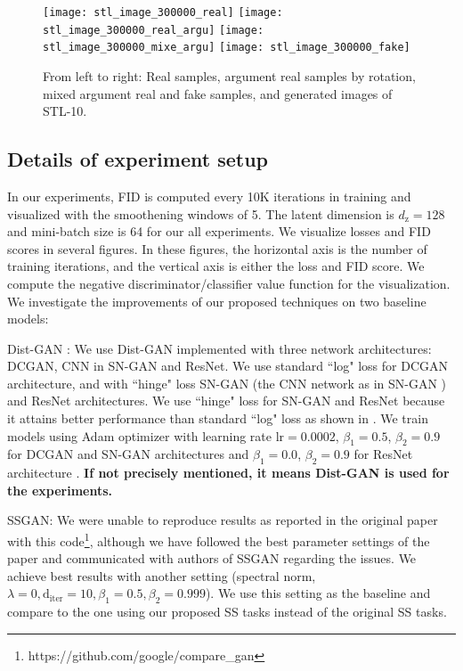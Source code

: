 \documentclass{article}
\begin{document}
\begin{figure}
  \centering
\texttt{[image: stl\_image\_300000\_real]}
  \texttt{[image: stl\_image\_300000\_real\_argu]}
  \texttt{[image: stl\_image\_300000\_mixe\_argu]}
  \texttt{[image: stl\_image\_300000\_fake]}
  \caption{From left to right: Real samples, argument real samples by rotation, mixed argument real and fake samples, and generated images of STL-10.}
  \label{stl_resnet_samples}
\end{figure}

\subsection{Details of experiment setup}
\label{ablation_study_ld}

In our experiments, FID is computed every 10K iterations in training and visualized with the smoothening windows of 5. The latent dimension is $d_\mathrm{z} = 128$ and mini-batch size is 64 for our all experiments. We visualize losses and FID scores in several figures. In these figures, the horizontal axis is the number of training iterations, and the vertical axis is either the loss and FID score. We compute the negative  discriminator/classifier value function for the visualization. We investigate the improvements of our proposed techniques on two baseline models:

Dist-GAN \cite{tran-eccv-2018}: We use Dist-GAN implemented with three network architectures: DCGAN, CNN in SN-GAN and ResNet.
We use standard ``log" loss for DCGAN architecture, and  with ``hinge" loss SN-GAN (the CNN network as in SN-GAN \cite{miyato-iclr-2018}) and ResNet architectures. We use ``hinge" loss for SN-GAN  and ResNet because it attains better performance than standard ``log" loss as shown in \cite{miyato-iclr-2018}. 
We train models using Adam optimizer with learning rate $\mathrm{lr} = 0.0002$, $\beta_1 = 0.5$, $\beta_2 = 0.9$ for DCGAN and SN-GAN architectures and $\beta_1 = 0.0$, $\beta_2 = 0.9$ for ResNet architecture \cite{gulrajani-arxiv-2017}. {\bf If not precisely mentioned, it means Dist-GAN is used for the experiments.}

SSGAN: We were unable to reproduce results as reported in the original paper with this code\footnote{https://github.com/google/compare\_gan}, although we have followed the best parameter settings of the paper and communicated with authors of SSGAN regarding the issues. We achieve best results with another setting (spectral norm, $\lambda = 0, \mathrm{d_{iter}} = 10, \beta_1 = 0.5, \beta_2 = 0.999$).
We use this setting as the baseline and compare to the one using our proposed SS tasks instead of the original SS tasks.
\end{document}
